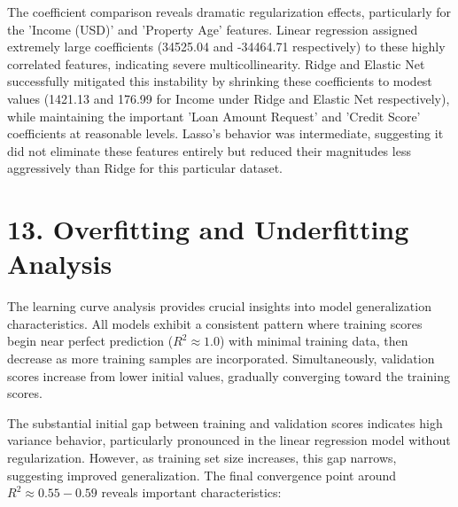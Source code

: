 \documentclass[11pt]{article}
\begin{document}
The coefficient comparison reveals dramatic regularization effects, particularly for the 'Income (USD)' and 'Property Age' features. Linear regression assigned extremely large coefficients (34525.04 and -34464.71 respectively) to these highly correlated features, indicating severe multicollinearity. Ridge and Elastic Net successfully mitigated this instability by shrinking these coefficients to modest values (1421.13 and 176.99 for Income under Ridge and Elastic Net respectively), while maintaining the important 'Loan Amount Request' and 'Credit Score' coefficients at reasonable levels. Lasso's behavior was intermediate, suggesting it did not eliminate these features entirely but reduced their magnitudes less aggressively than Ridge for this particular dataset.

\section*{13. Overfitting and Underfitting Analysis}

The learning curve analysis provides crucial insights into model generalization characteristics. All models exhibit a consistent pattern where training scores begin near perfect prediction ($R^2 \approx 1.0$) with minimal training data, then decrease as more training samples are incorporated. Simultaneously, validation scores increase from lower initial values, gradually converging toward the training scores.

The substantial initial gap between training and validation scores indicates high variance behavior, particularly pronounced in the linear regression model without regularization. However, as training set size increases, this gap narrows, suggesting improved generalization. The final convergence point around $R^2 \approx 0.55-0.59$ reveals important characteristics:
\end{document}
